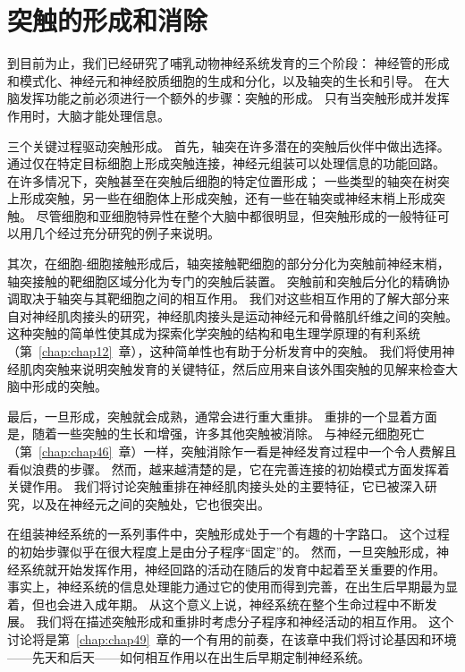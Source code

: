 \chapter{突触的形成和消除} \label{chap:chap48}

到目前为止，我们已经研究了哺乳动物神经系统发育的三个阶段：
神经管的形成和模式化、神经元和神经胶质细胞的生成和分化，以及轴突的生长和引导。
在大脑发挥功能之前必须进行一个额外的步骤：突触的形成。
只有当突触形成并发挥作用时，大脑才能处理信息。


三个关键过程驱动突触形成。
首先，轴突在许多潜在的突触后伙伴中做出选择。
通过仅在特定目标细胞上形成突触连接，神经元组装可以处理信息的功能回路。
在许多情况下，突触甚至在突触后细胞的特定位置形成；
一些类型的轴突在树突上形成突触，另一些在细胞体上形成突触，还有一些在轴突或神经末梢上形成突触。
尽管细胞和亚细胞特异性在整个大脑中都很明显，但突触形成的一般特征可以用几个经过充分研究的例子来说明。


其次，在细胞-细胞接触形成后，轴突接触靶细胞的部分分化为突触前神经末梢，轴突接触的靶细胞区域分化为专门的突触后装置。
突触前和突触后分化的精确协调取决于轴突与其靶细胞之间的相互作用。
我们对这些相互作用的了解大部分来自对神经肌肉接头的研究，神经肌肉接头是运动神经元和骨骼肌纤维之间的突触。
这种突触的简单性使其成为探索化学突触的结构和电生理学原理的有利系统（第~\ref{chap:chap12}~章），这种简单性也有助于分析发育中的突触。
我们将使用神经肌肉突触来说明突触发育的关键特征，然后应用来自该外围突触的见解来检查大脑中形成的突触。


最后，一旦形成，突触就会成熟，通常会进行重大重排。
重排的一个显着方面是，随着一些突触的生长和增强，许多其他突触被消除。
与神经元细胞死亡（第~\ref{chap:chap46}~章）一样，突触消除乍一看是神经发育过程中一个令人费解且看似浪费的步骤。
然而，越来越清楚的是，它在完善连接的初始模式方面发挥着关键作用。
我们将讨论突触重排在神经肌肉接头处的主要特征，它已被深入研究，以及在神经元之间的突触处，它也很突出。


在组装神经系统的一系列事件中，突触形成处于一个有趣的十字路口。
这个过程的初始步骤似乎在很大程度上是由分子程序“固定”的。
然而，一旦突触形成，神经系统就开始发挥作用，神经回路的活动在随后的发育中起着至关重要的作用。
事实上，神经系统的信息处理能力通过它的使用而得到完善，在出生后早期最为显着，但也会进入成年期。
从这个意义上说，神经系统在整个生命过程中不断发展。 我们将在描述突触形成和重排时考虑分子程序和神经活动的相互作用。
这个讨论将是第~\ref{chap:chap49}~章的一个有用的前奏，在该章中我们将讨论基因和环境——先天和后天——如何相互作用以在出生后早期定制神经系统。



